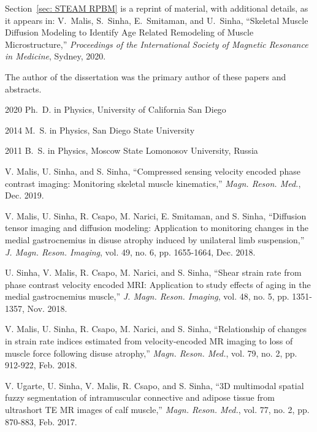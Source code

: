 \begin{frontmatter}
\begin{acknowledgements}
Section~\ref{sec: STEAM RPBM} is a reprint of material, with additional details, as it appears in: V.~Malis, S.~Sinha, E.~Smitaman, and U.~Sinha, ``Skeletal Muscle Diffusion Modeling to Identify Age Related Remodeling of Muscle Microstructure,'' \emph{Proceedings of the International Society of Magnetic Resonance in Medicine}, Sydney, 2020.

The author of the dissertation was the primary author of these papers and abstracts.
\end{acknowledgements}


%
%
\begin{vitapage}
\begin{vita}
  \item[2020] Ph.~D. in Physics, University of California San Diego
  \item[2014] M.~S. in Physics, San Diego State University
  \item[2011] B.~S. in Physics, Moscow State Lomonosov University, Russia
  \end{vita}
\begin{publications}
  \item   V. Malis, U. Sinha, and S. Sinha, ``Compressed sensing velocity encoded phase contrast imaging: Monitoring skeletal muscle kinematics,'' \emph{Magn. Reson. Med.}, Dec. 2019.
  \item V. Malis, U. Sinha, R. Csapo, M. Narici, E. Smitaman, and S. Sinha, ``Diffusion tensor imaging and diffusion modeling: Application to monitoring changes in the medial gastrocnemius in disuse atrophy induced by unilateral limb suspension,'' \emph{J. Magn. Reson. Imaging}, vol. 49, no. 6, pp. 1655-1664, Dec. 2018.
  \item U. Sinha, V. Malis, R. Csapo, M. Narici, and S. Sinha, ``Shear strain rate from phase contrast velocity encoded MRI: Application to study effects of aging in the medial gastrocnemius muscle,'' \emph{J. Magn. Reson. Imaging}, vol. 48, no. 5, pp. 1351-1357, Nov. 2018.
  \item	V. Malis, U. Sinha, R. Csapo, M. Narici, and S. Sinha, ``Relationship of changes in strain rate indices estimated from velocity-encoded MR imaging to loss of muscle force following disuse atrophy,'' \emph{Magn. Reson. Med.}, vol. 79, no. 2, pp. 912-922, Feb. 2018.
  \item	V. Ugarte, U. Sinha, V. Malis, R. Csapo, and S. Sinha, ``3D multimodal spatial fuzzy segmentation of intramuscular connective and adipose tissue from ultrashort TE MR images of calf muscle,'' \emph{Magn. Reson. Med.}, vol. 77, no. 2, pp. 870-883, Feb. 2017.

\end{publications}
\end{vitapage}
\end{frontmatter}
